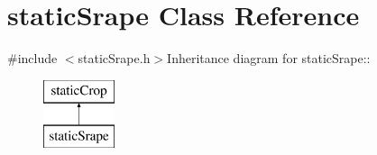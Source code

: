 \hypertarget{classstatic_srape}{
\section{staticSrape Class Reference}
\label{classstatic_srape}
}


{\ttfamily \#include $<$staticSrape.h$>$}Inheritance diagram for staticSrape::\begin{figure}[H]
\begin{center}
\leavevmode
\includegraphics[height=2cm]{classstatic_srape}
\end{center}
\end{figure}
